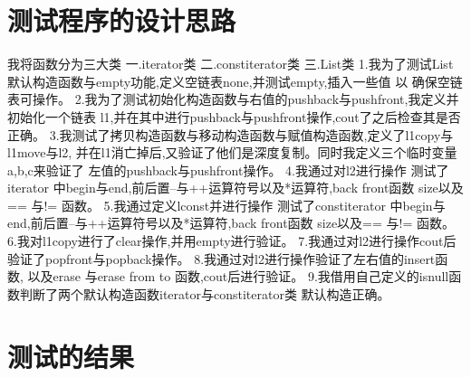 \documentclass[UTF8]{ctexart}
\begin{document}
\pagestyle{fancy}
\fancyhead{}

\section{测试程序的设计思路}

我将函数分为三大类
\newline
一.iterator类
\newline 
二.constiterator类
\newline
三.List类
\newline
1.我为了测试List默认构造函数与empty功能,定义空链表none,并测试empty,插入一些值
以
确保空链表可操作。
\newline
2.我为了测试初始化构造函数与右值的pushback与pushfront,我定义并初始化一个链表
l1,并在其中进行pushback与pushfront操作,cout了之后检查其是否正确。
\newline
3.我测试了拷贝构造函数与移动构造函数与赋值构造函数,定义了l1copy与l1move与l2,
并在l1消亡掉后,又验证了他们是深度复制。同时我定义三个临时变量a,b,c来验证了
左值的pushback与pushfront操作。
\newline
4.我通过对l2进行操作
测试了iterator 中begin与end,前后置--与++运算符号以及*运算符,back front函数
size以及== 与!= 函数。
\newline
5.我通过定义lconst并进行操作
测试了constiterator 中begin与end,前后置--与++运算符号以及*运算符,back front函数
size以及== 与!= 函数。
\newline
6.我对l1copy进行了clear操作,并用empty进行验证。
\newline
7.我通过对l2进行操作cout后
验证了popfront与popback操作。
\newline
8.我通过对l2进行操作验证了左右值的insert函数,
以及erase 与erase from to 函数,cout后进行验证。
\newline
9.我借用自己定义的isnull函数判断了两个默认构造函数iterator与constiterator类
默认构造正确。

\section{测试的结果}
\end{document}

